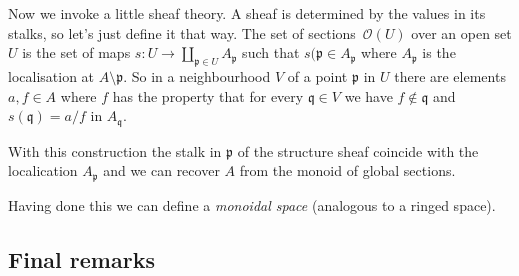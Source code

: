 \begin{enumerate}
    Now we invoke a little sheaf theory. A sheaf is determined by the values in its stalks, so let's just define it that way. The set of sections~$\mathcal{O}(U)$ over an open set $U$ is the set of maps $s\colon U\to\coprod_{\mathfrak{p}\in U}A_{\mathfrak{p}}$ such that $s(\mathfrak{p}\in A_{\mathfrak{p}}$ where $A_{\mathfrak{p}}$ is the localisation at $A\setminus\mathfrak{p}$. So in a neighbourhood $V$ of a point $\mathfrak{p}$ in $U$ there are elements $a,f\in A$ where $f$ has the property that for every $\mathfrak{q}\in V$ we have $f\notin\mathfrak{q}$ and $s(\mathfrak{q})=a/f$ in $A_{\mathfrak{q}}$.

    With this construction the stalk in $\mathfrak{p}$ of the structure sheaf coincide with the localication $A_{\mathfrak{p}}$ and we can recover $A$ from the monoid of global sections.
\end{enumerate}

Having done this we can define a \emph{monoidal space} (analogous to a ringed space).



\subsection{Final remarks}
